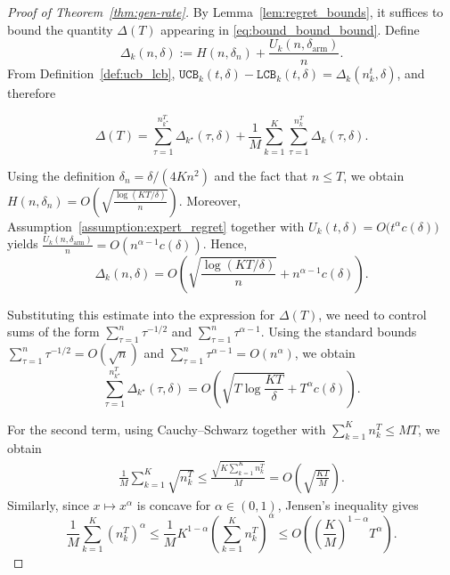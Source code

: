 \documentclass[a4paper,14pt]{extarticle}
\theoremstyle{plain}
\newcommand{\LCB}{\texttt{LCB}}
\newcommand{\UCB}{\texttt{UCB}}
\begin{document}
\begin{proof}[Proof of Theorem~\ref{thm:gen-rate}]

By Lemma~\ref{lem:regret_bounds}, it suffices to bound the quantity $\Delta(T)$ appearing in \eqref{eq:bound_bound_bound}. Define
\begin{equation}
\Delta_k(n,\delta) := H(n,\delta_n) + \frac{U_k(n,\delta_{\mathrm{arm}})}{n}.
\end{equation}
From Definition~\ref{def:ucb_lcb}, $ \UCB_k(t,\delta)-\LCB_k(t,\delta) = \Delta_k(n_k^t,\delta)$,
and therefore

\begin{equation}
\Delta(T)
=
\sum_{\tau=1}^{n_{k^\star}^T}
\Delta_{k^\star}(\tau,\delta)
+
\frac1M
\sum_{k=1}^{K}
\sum_{\tau=1}^{n_k^T}
\Delta_k(\tau,\delta).
\end{equation}

Using the definition $\delta_n=\delta/(4Kn^2)$ and the fact that
$n\le T$, we obtain
$ H(n,\delta_n) = O\!\left( \sqrt{\frac{\log(KT/\delta)}{n}} \right)$.
Moreover, Assumption~\ref{assumption:expert_regret} together with $U_k(t,\delta)=O\bigl(t^{\alpha}c(\delta)\bigr)$  yields
$ \frac{U_k(n,\delta_{\mathrm{arm}})}{n} = O\!\left( n^{\alpha-1}c(\delta) \right)$.
Hence,
\begin{equation*}
\Delta_k(n,\delta) = O\!\left( \sqrt{\frac{\log(KT/\delta)}{n}} + n^{\alpha-1}c(\delta) \right).
\end{equation*}

Substituting this estimate into the expression for $\Delta(T)$, we need
to control sums of the form
$\sum_{\tau=1}^{n}\tau^{-1/2}$ and $\sum_{\tau=1}^{n}\tau^{\alpha-1}$. Using the standard bounds
$\sum_{\tau=1}^{n}\tau^{-1/2}=O(\sqrt n)$ and  $\sum_{\tau=1}^{n}\tau^{\alpha-1} = O(n^\alpha)$, we obtain
\begin{equation}
\sum_{\tau=1}^{n_{k^\star}^T} \Delta_{k^\star}(\tau,\delta) = O\!\left( \sqrt{T\log\frac{KT}{\delta}} + T^\alpha c(\delta) \right).
\end{equation}

For the second term, using Cauchy--Schwarz together with
$\sum_{k=1}^{K} n_k^T \le MT$, we obtain
\begin{align}
\frac1M \sum_{k=1}^{K}\sqrt{n_k^T} \le \frac{\sqrt{K\sum_{k=1}^{K}n_k^T}}{M}= O\!\left( \sqrt{\frac{KT}{M}} \right).
\end{align}
Similarly, since $x\mapsto x^\alpha$ is concave for $\alpha\in(0,1)$,
Jensen's inequality gives
\begin{equation}
\frac1M\sum_{k=1}^{K}(n_k^T)^\alpha \le
\frac1M K^{1-\alpha} \left(\sum_{k=1}^{K}n_k^T\right)^\alpha
\le
O\!\left( \left(\frac{K}{M}\right)^{1-\alpha} T^\alpha \right).
\end{equation}


\end{proof}
\end{document}
